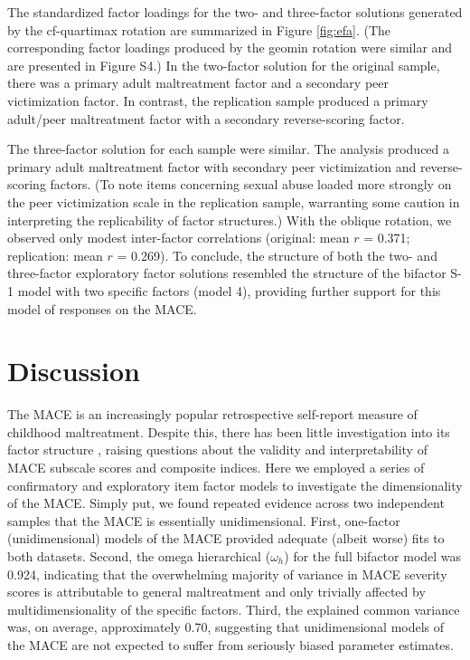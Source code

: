 \documentclass[letterpaper,man,natbib]{apa6}  %
\begin{document}
The standardized factor loadings for the two- and three-factor solutions generated by the cf-quartimax rotation are summarized in Figure \ref{fig:efa}. (The corresponding factor loadings produced by the geomin rotation were similar and are presented in Figure S4.) In the two-factor solution for the original sample, there was a primary adult maltreatment factor and a secondary peer victimization factor. In contrast, the replication sample produced a primary adult/peer maltreatment factor with a secondary reverse-scoring factor. 

The three-factor solution for each sample were similar. The analysis produced a primary adult maltreatment factor with secondary peer victimization and reverse-scoring factors. (To note items concerning sexual abuse loaded more strongly on the peer victimization scale in the replication sample, warranting some caution in interpreting the replicability of factor structures.) With the oblique rotation, we observed only modest inter-factor correlations (original: mean $r$ = 0.371; replication: mean $r$ = 0.269). To conclude, the structure of both the two- and three-factor exploratory factor solutions resembled the structure of the bifactor S-1 model with two specific factors (model 4), providing further support for this model of responses on the MACE. 

\section{Discussion}

The MACE is an increasingly popular retrospective self-report measure of childhood maltreatment. Despite this, there has been little investigation into its factor structure \citep{saini2019systematic}, raising questions about the validity and interpretability of MACE subscale scores and composite indices. Here we employed a series of confirmatory and exploratory item factor models to investigate the dimensionality of the MACE. Simply put, we found repeated evidence across two independent samples that the MACE is essentially unidimensional. First, one-factor (unidimensional) models of the MACE provided adequate (albeit worse) fits to both datasets. Second, the omega hierarchical ($\omega_h$) for the full bifactor model was 0.924, indicating that the overwhelming majority of variance  in MACE severity scores is attributable to general maltreatment and only trivially affected by multidimensionality of the specific factors. Third, the explained common variance was, on average, approximately 0.70, suggesting that unidimensional models of the MACE are not expected to suffer from seriously biased parameter estimates. 
\end{document}
